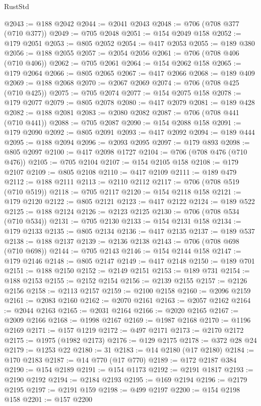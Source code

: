 \begin{lexlean}{RustStd}
\begin{coremodule}
@2043 := @188 @2042
@2044 := @2041 @2043
@2048 := @706 (@708 @377 (@710 @377))
@2049 := @705 @2048
@2051 := @154 @2049 @158
@2052 := @179 @2051
@2053 := @805 @2052
@2054 := @417 @2053
@2055 := @189 @380
@2056 := @188 @2055
@2057 := @2054 @2056
@2061 := @706 (@708 @406 (@710 @406))
@2062 := @705 @2061
@2064 := @154 @2062 @158
@2065 := @179 @2064
@2066 := @805 @2065
@2067 := @417 @2066
@2068 := @189 @409
@2069 := @188 @2068
@2070 := @2067 @2069
@2074 := @706 (@708 @425 (@710 @425))
@2075 := @705 @2074
@2077 := @154 @2075 @158
@2078 := @179 @2077
@2079 := @805 @2078
@2080 := @417 @2079
@2081 := @189 @428
@2082 := @188 @2081
@2083 := @2080 @2082
@2087 := @706 (@708 @441 (@710 @441))
@2088 := @705 @2087
@2090 := @154 @2088 @158
@2091 := @179 @2090
@2092 := @805 @2091
@2093 := @417 @2092
@2094 := @189 @444
@2095 := @188 @2094
@2096 := @2093 @2095
@2097 := @179 @893
@2098 := @805 @2097
@2100 := @417 @2098 @1727
@2104 := @706 (@708 @476 (@710 @476))
@2105 := @705 @2104
@2107 := @154 @2105 @158
@2108 := @179 @2107
@2109 := @805 @2108
@2110 := @417 @2109
@2111 := @189 @479
@2112 := @188 @2111
@2113 := @2110 @2112
@2117 := @706 (@708 @519 (@710 @519))
@2118 := @705 @2117
@2120 := @154 @2118 @158
@2121 := @179 @2120
@2122 := @805 @2121
@2123 := @417 @2122
@2124 := @189 @522
@2125 := @188 @2124
@2126 := @2123 @2125
@2130 := @706 (@708 @534 (@710 @534))
@2131 := @705 @2130
@2133 := @154 @2131 @158
@2134 := @179 @2133
@2135 := @805 @2134
@2136 := @417 @2135
@2137 := @189 @537
@2138 := @188 @2137
@2139 := @2136 @2138
@2143 := @706 (@708 @698 (@710 @698))
@2144 := @705 @2143
@2146 := @154 @2144 @158
@2147 := @179 @2146
@2148 := @805 @2147
@2149 := @417 @2148
@2150 := @189 @701
@2151 := @188 @2150
@2152 := @2149 @2151
@2153 := @189 @731
@2154 := @188 @2153
@2155 := @2152 @2154
@2156 := @2139 @2155
@2157 := @2126 @2156
@2158 := @2113 @2157
@2159 := @2100 @2158
@2160 := @2096 @2159
@2161 := @2083 @2160
@2162 := @2070 @2161
@2163 := @2057 @2162
@2164 := @2044 @2163
@2165 := @2031 @2164
@2166 := @2020 @2165
@2167 := @2009 @2166
@2168 := @1998 @2167
@2169 := @1987 @2168
@2170 := @1196 @2169
@2171 := @157 @1219
@2172 := @497 @2171
@2173 := @2170 @2172
@2175 := @1975 (@1982 @2173)
@2176 := @129 @2175
@2178 := @372 @28 @24
@2179 := @1253 @22
@2180 := 31
@2183 := @14 @2180 (@17 @2180)
@2184 := @170 @2183
@2187 := @14 @770 (@17 @770)
@2189 := @172 @2187 @384
@2190 := @154 @2189
@2191 := @154 @1173
@2192 := @2191 @1817
@2193 := @2190 @2192
@2194 := @2184 @2193
@2195 := @169 @2194
@2196 := @2179 @2195
@2197 := @2191 @159
@2198 := @499 @2197
@2200 := @154 @2198 @158
@2201 := @157 @2200

\end{coremodule}
\end{lexlean}
